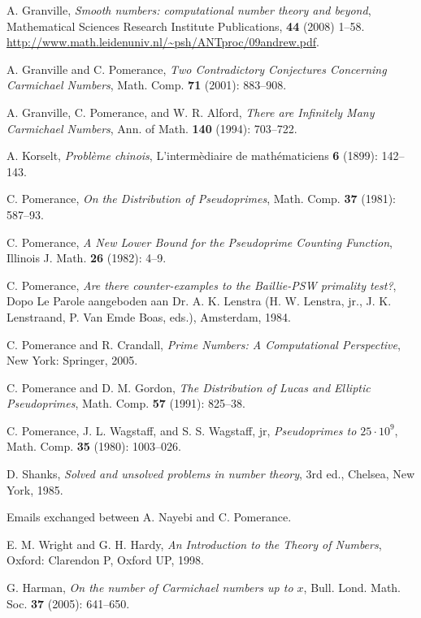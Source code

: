 \documentclass[11pt]{article}
\theoremstyle{plain}
\theoremstyle{definition}
\theoremstyle{remark}
\numberwithin{equation}{subsection}
\begin{document}
\normalsize{
\begin{thebibliography}{13}

A. Granville, \emph{Smooth numbers: computational number theory and beyond}, Mathematical Sciences Research Institute Publications, \textbf{44} (2008) 1--58. \url{http://www.math.leidenuniv.nl/~psh/ANTproc/09andrew.pdf}.

A. Granville and C. Pomerance, \emph{Two Contradictory Conjectures Concerning Carmichael Numbers}, Math. Comp. \textbf{71} (2001): 883--908.

A. Granville, C. Pomerance, and W. R. Alford, \emph{There are Infinitely Many Carmichael Numbers}, Ann. of Math. \textbf{140} (1994): 703--722.

A. Korselt, \emph{Probl\`{e}me chinois}, L'interm\`{e}diaire de math\'{e}maticiens \textbf{6} (1899): 142--143.

C. Pomerance, \emph{On the Distribution of Pseudoprimes}, Math. Comp. \textbf{37} (1981): 587--93.

C. Pomerance, \emph{A New Lower Bound for the Pseudoprime Counting Function}, Illinois J. Math. \textbf{26} (1982): 4--9.

C. Pomerance, \emph{Are there counter-examples to the Baillie-PSW primality test?}, Dopo Le Parole aangeboden aan Dr. A. K. Lenstra (H. W. Lenstra, jr., J. K. Lenstraand, P. Van Emde Boas, eds.), Amsterdam, 1984.

C. Pomerance and R. Crandall, \emph{Prime Numbers: A Computational Perspective}, New York: Springer, 2005.

C. Pomerance and D. M. Gordon, \emph{The Distribution of Lucas and Elliptic Pseudoprimes}, Math. Comp. \textbf{57} (1991): 825--38.

C. Pomerance, J. L. Wagstaff, and S. S. Wagstaff, jr, \emph{Pseudoprimes to $25 \cdot 10^{9}$}, Math. Comp. \textbf{35} (1980): 1003--026.

D. Shanks, \emph{Solved and unsolved problems in number theory}, 3rd ed., Chelsea, New York, 1985.

Emails exchanged between A. Nayebi and C. Pomerance.

E. M. Wright and G. H. Hardy, \emph{An Introduction to the Theory of Numbers}, Oxford: Clarendon P, Oxford UP, 1998.

G. Harman, \emph{On the number of Carmichael numbers up to $x$}, Bull. Lond. Math. Soc. \textbf{37} (2005): 641--650.


\end{thebibliography}}
\end{document}
